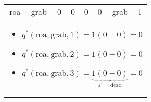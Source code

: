 \begin{example}
\begin{center}
\begin{tabular}{cccccccc}
            \midrule 
            roa & grab & 0 & 0 & 0 & 0 & grab & 1 \\
            \multicolumn{8}{p{\linewidth}}{
            \begin{itemize}
                \item $q^*(\text{roa}, \text{grab}, 1) = 1(0 + 0) = 0$
                \item $q^*(\text{roa}, \text{grab}, 2) = 1(0 + 0) = 0$
                \item $q^*(\text{roa}, \text{grab}, 3) = \underbrace{1(0 + 0)}_{\text{$s'=$dead}} = 0$
            \end{itemize}} \\
            \bottomrule            
        \end{tabular}
    \end{center}
\end{example}

